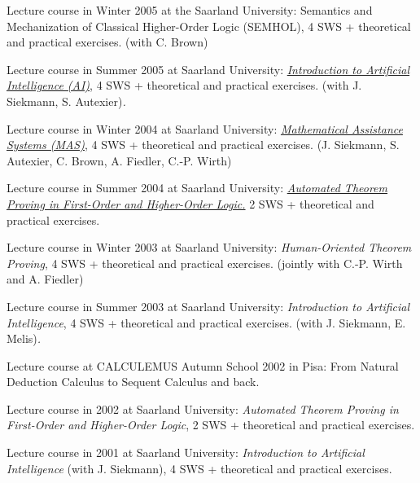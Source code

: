 \documentclass{letter}
\newcommand{\tmstrong}[1]{\textbf{#1}}
\newcommand{\tmtextit}[1]{{\itshape{#1}}}
\begin{document}
  \item Lecture course in Winter 2005 at the {\tmstrong{}}Saarland University:
  Semantics and Mechanization of Classical Higher-Order Logic (SEMHOL), 4 SWS
  + theoretical and practical exercises. (with C. Brown)
  
  \item Lecture course in Summer 2005 at Saarland University:
  \href{http://www.ags.uni-sb.de/\~{
  }omega/teach/KI05/}{\tmtextit{Introduction to Artificial Intelligence
  (AI)}}, 4 SWS + theoretical and practical exercises. (with J. Siekmann, S.
  Autexier)\tmtextit{.}
  
  \item Lecture course in Winter 2004 at Saarland University:
  \tmtextit{\href{http://www.ags.uni-sb.de/\~{
  }omega/teach/MAS0405/index.php}{Mathematical Assistance Systems (MAS)}}, 4
  SWS + theoretical and practical exercises. (J. Siekmann, S. Autexier, C.
  Brown, A. Fiedler, C.-P. Wirth)
  
  \item Lecture course in Summer 2004 at Saarland University:
  \tmtextit{\href{../lectures/fol-hol-tp/index.html}{Automated Theorem Proving
  in First-Order and Higher-Order Logic.}} 2 SWS + theoretical and practical
  exercises.
  
  \item Lecture course in Winter 2003 at Saarland University:
  \tmtextit{Human-Oriented Theorem Proving}, 4 SWS + theoretical and practical
  exercises. (jointly with C.-P. Wirth and A. Fiedler)
  
  \item Lecture course in Summer 2003 at Saarland University:
  \tmtextit{Introduction to Artificial Intelligence}, 4 SWS + theoretical and
  practical exercises. (with J. Siekmann, E. Melis)\tmtextit{.}
  
  \item Lecture course at CALCULEMUS Autumn School 2002 in Pisa: From Natural
  Deduction Calculus to Sequent Calculus and back.
  
  \item Lecture course in 2002 at Saarland University: \tmtextit{Automated
  Theorem Proving in First-Order and Higher-Order Logic}, 2 SWS + theoretical
  and practical exercises.
  
  \item Lecture course in 2001 at Saarland University: \tmtextit{Introduction
  to Artificial Intelligence} (with J. Siekmann), 4 SWS + theoretical and
  practical exercises.
  
\end{document}

